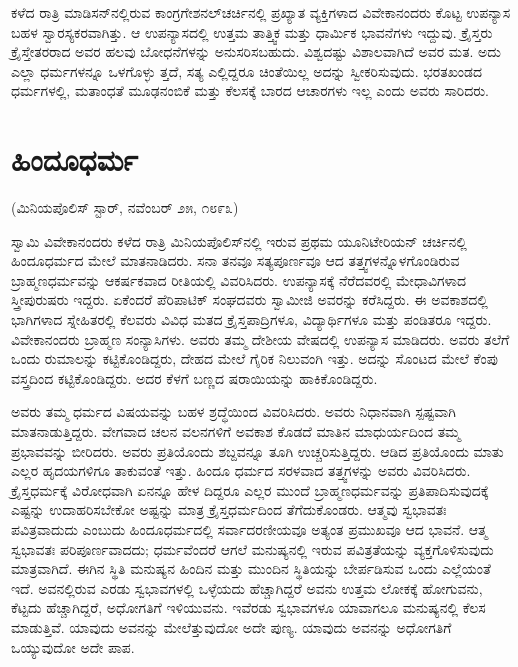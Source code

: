 ಕಳೆದ ರಾತ್ರಿ ಮಾಡಿಸನ್​ನಲ್ಲಿರುವ ಕಾಂಗ್ರಗೇಶನಲ್​ಚರ್ಚಿನಲ್ಲಿ ಪ್ರಖ್ಯಾತ ವ್ಯಕ್ತಿಗಳಾದ ವಿವೇಕಾನಂದರು ಕೊಟ್ಟ ಉಪನ್ಯಾಸ ಬಹಳ ಸ್ವಾರಸ್ಯಕರವಾಗಿತ್ತು. ಆ ಉಪನ್ಯಾಸದಲ್ಲಿ ಉತ್ತಮ ತಾತ್ತ್ವಿಕ ಮತ್ತು ಧಾರ್ಮಿಕ ಭಾವನೆಗಳು ಇದ್ದುವು. ಕ್ರೈಸ್ತರು ಕ್ರೈಸ್ತೇತರರಾದ ಅವರ ಹಲವು ಬೋಧನೆಗಳನ್ನು ಅನುಸರಿಸಬಹುದು. ವಿಶ್ವದಷ್ಟು ವಿಶಾಲವಾಗಿದೆ ಅವರ ಮತ. ಅದು ಎಲ್ಲಾ ಧರ್ಮಗಳನ್ನೂ ಒಳಗೊಳ್ಳು ತ್ತದೆ, ಸತ್ಯ ಎಲ್ಲಿದ್ದರೂ ಚಿಂತೆಯಿಲ್ಲ ಅದನ್ನು ಸ್ವೀಕರಿಸುವುದು. ಭರತಖಂಡದ ಧರ್ಮಗಳಲ್ಲಿ, ಮತಾಂಧತೆ ಮೂಢನಂಬಿಕೆ ಮತ್ತು ಕೆಲಸಕ್ಕೆ ಬಾರದ ಆಚಾರಗಳು ಇಲ್ಲ ಎಂದು ಅವರು ಸಾರಿದರು.

\delimiter


\section{ಹಿಂದೂಧರ್ಮ}

\begin{center}
(ಮಿನಿಯಪೊಲಿಸ್​ ಸ್ಟಾರ್​, ನವೆಂಬರ್​ ೨೫, ೧೮೯೩)
\end{center}

ಸ್ವಾಮಿ ವಿವೇಕಾನಂದರು ಕಳೆದ ರಾತ್ರಿ ಮಿನಿಯಪೊಲಿಸ್​ನಲ್ಲಿ ಇರುವ ಪ್ರಥಮ ಯೂನಿಟೇರಿಯನ್​ ಚರ್ಚಿನಲ್ಲಿ ಹಿಂದೂಧರ್ಮದ ಮೇಲೆ ಮಾತನಾಡಿದರು. ಸನಾ ತನವೂ ಸತ್ಯಪೂರ್ಣವೂ ಆದ ತತ್ತ್ವಗಳನ್ನೊಳಗೊಂಡಿರುವ ಬ್ರಾಹ್ಮಣಧರ್ಮವನ್ನು ಆಕರ್ಷಕವಾದ ರೀತಿಯಲ್ಲಿ ವಿವರಿಸಿದರು. ಉಪನ್ಯಾಸಕ್ಕೆ ನೆರೆದವರಲ್ಲಿ ಮೇಧಾವಿಗಳಾದ ಸ್ತ್ರೀಪುರುಷರು ಇದ್ದರು. ಏಕೆಂದರೆ ಪೆರಿಪಾಟಿಕ್​ ಸಂಘದವರು ಸ್ವಾಮೀಜಿ ಅವರನ್ನು ಕರೆಸಿದ್ದರು. ಈ ಅವಕಾಶದಲ್ಲಿ ಭಾಗಿಗಳಾದ ಸ್ನೇಹಿತರಲ್ಲಿ ಕೆಲವರು ವಿವಿಧ ಮತದ ಕ್ರೈಸ್ತಪಾದ್ರಿಗಳೂ, ವಿದ್ಯಾರ್ಥಿಗಳೂ ಮತ್ತು ಪಂಡಿತರೂ ಇದ್ದರು. ವಿವೇಕಾನಂದರು ಬ್ರಾಹ್ಮಣ ಸಂನ್ಯಾಸಿಗಳು. ಅವರು ತಮ್ಮ ದೇಶೀಯ ವೇಷದಲ್ಲಿ ಉಪನ್ಯಾಸ ಮಾಡಿದರು. ಅವರು ತಲೆಗೆ ಒಂದು ರುಮಾಲನ್ನು ಕಟ್ಟಿಕೊಂಡಿದ್ದರು, ದೇಹದ ಮೇಲೆ ಗೈರಿಕ ನಿಲುವಂಗಿ ಇತ್ತು. ಅದನ್ನು ಸೊಂಟದ ಮೇಲೆ ಕೆಂಪು ವಸ್ತ್ರದಿಂದ ಕಟ್ಟಿಕೊಂಡಿದ್ದರು. ಅದರ ಕೆಳಗೆ ಬಣ್ಣದ ಷರಾಯಿಯನ್ನು ಹಾಕಿಕೊಂಡಿದ್ದರು.

ಅವರು ತಮ್ಮ ಧರ್ಮದ ವಿಷಯವನ್ನು ಬಹಳ ಶ್ರದ್ಧೆಯಿಂದ ವಿವರಿಸಿದರು. ಅವರು ನಿಧಾನವಾಗಿ ಸ್ಪಷ್ಟವಾಗಿ ಮಾತನಾಡುತ್ತಿದ್ದರು. ವೇಗವಾದ ಚಲನ ವಲನಗಳಿಗೆ ಅವಕಾಶ ಕೊಡದೆ ಮಾತಿನ ಮಾಧುರ್ಯದಿಂದ ತಮ್ಮ ಪ್ರಭಾವವನ್ನು ಬೀರಿದರು. ಅವರು ಪ್ರತಿಯೊಂದು ಶಬ್ದವನ್ನೂ ತೂಗಿ ಉಚ್ಚರಿಸುತ್ತಿದ್ದರು. ಆಡಿದ ಪ್ರತಿಯೊಂದು ಮಾತು ಎಲ್ಲರ ಹೃದಯಗಳಿಗೂ ತಾಕುವಂತೆ ಇತ್ತು. ಹಿಂದೂ ಧರ್ಮದ ಸರಳವಾದ ತತ್ತ್ವಗಳನ್ನು ಅವರು ವಿವರಿಸಿದರು. ಕ್ರೈಸ್ತಧರ್ಮಕ್ಕೆ ವಿರೋಧವಾಗಿ ಏನನ್ನೂ ಹೇಳ ದಿದ್ದರೂ ಎಲ್ಲರ ಮುಂದೆ ಬ್ರಾಹ್ಮಣಧರ್ಮವನ್ನು ಪ್ರತಿಪಾದಿಸುವುದಕ್ಕೆ ಎಷ್ಟನ್ನು ಉದಾಹರಿಸಬೇಕೋ ಅಷ್ಟನ್ನು ಮಾತ್ರ ಕ್ರೈಸ್ತಧರ್ಮದಿಂದ ತೆಗೆದುಕೊಂಡರು. ಆತ್ಮವು ಸ್ವಭಾವತಃ ಪವಿತ್ರವಾದುದು ಎಂಬುದು ಹಿಂದೂಧರ್ಮದಲ್ಲಿ ಸರ್ವಾದರಣೀಯವೂ ಅತ್ಯಂತ ಪ್ರಮುಖವೂ ಆದ ಭಾವನೆ. ಆತ್ಮ ಸ್ವಭಾವತಃ ಪರಿಪೂರ್ಣವಾದದು; ಧರ್ಮವೆಂದರೆ ಆಗಲೆ ಮನುಷ್ಯನಲ್ಲಿ ಇರುವ ಪವಿತ್ರತೆಯನ್ನು ವ್ಯಕ್ತಗೊಳಿಸುವುದು ಮಾತ್ರವಾಗಿದೆ. ಈಗಿನ ಸ್ಥಿತಿ ಮನುಷ್ಯನ ಹಿಂದಿನ ಮತ್ತು ಮುಂದಿನ ಸ್ಥಿತಿಯನ್ನು ಬೇರ್ಪಡಿಸುವ ಒಂದು ಎಲ್ಲೆಯಂತೆ ಇದೆ. ಅವನಲ್ಲಿರುವ ಎರಡು ಸ್ವಭಾವಗಳಲ್ಲಿ ಒಳ್ಳೆಯದು ಹೆಚ್ಚಾಗಿದ್ದರೆ ಅವನು ಉತ್ತಮ ಲೋಕಕ್ಕೆ ಹೋಗುವನು, ಕೆಟ್ಟದು ಹೆಚ್ಚಾಗಿದ್ದರೆ, ಅಧೋಗತಿಗೆ ಇಳಿಯುವನು. ಇವೆರಡು ಸ್ವಭಾವಗಳೂ ಯಾವಾಗಲೂ ಮನುಷ್ಯನಲ್ಲಿ ಕೆಲಸ ಮಾಡುತ್ತಿವೆ. ಯಾವುದು ಅವನನ್ನು ಮೇಲೆತ್ತುವುದೋ ಅದೇ ಪುಣ್ಯ. ಯಾವುದು ಅವನನ್ನು ಅಧೋಗತಿಗೆ ಒಯ್ಯುವುದೋ ಅದೇ ಪಾಪ.

